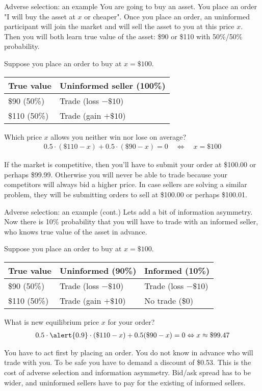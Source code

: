 \documentclass{beamer}
\begin{document}
\begin{frame}{Adverse selection: an example}
\justify
You are going to buy an asset. You place an order
"I will buy the asset at $x$ or cheaper". Once you place an order, an uninformed participant will join the market and will sell the asset to you at this price $x$. Then you will both learn true value of the asset: \$90 or \$110 with 50\%/50\% probability.

\justify
Suppose you place an order to buy at $x=\$100$.

\centering
\begin{tabular}{l|l}
True value & Uninformed seller (100\%)  \\ \hline
\$90 (50\%) & Trade (loss $-\$10$) \\ \hline
\$110 (50\%) & Trade (gain $+\$10$) 
\end{tabular}

\justify
Which price $x$ allows you neither win nor lose on average?
\begin{align*}
0.5\cdot(\$110 - x) + 0.5\cdot(\$90 - x) = 0 \quad \Leftrightarrow \quad x = \$100
\end{align*}

\justify
If the market is competitive, then you'll have to submit your order at \$100.00 or perhaps \$99.99. Otherwise you will never be able to trade because your competitors will always bid a higher price. In case sellers are solving a similar problem, they will be submitting orders to sell at \$100.00 or perhaps \$100.01.
\end{frame}



\begin{frame}{Adverse selection: an example (cont.)}
\justify
Lets add a bit of information asymmetry. Now there is 10\% probability that you will
have to trade with an \alert{informed} seller, who knows true value of the asset in advance.

\justify
Suppose you place an order to buy at $x=\$100$.

\centering
\begin{tabular}{l|l|l}
True value & Uninformed (90\%) & Informed (10\%) \\ \hline
\$90 (50\%) & Trade (loss $-\$10$) & Trade (loss $-\$10$) \\ \hline
\$110 (50\%) & Trade (gain $+\$10$) & No trade (\$0) 
\end{tabular}

\justify
What is new equilibrium price $x$ for your order?
\begin{align*}
0.5\cdot\alert{0.9}\cdot(\$110 - x) + 0.5(\$90 - x) = 0 \Leftrightarrow x \approx \$99.47
\end{align*}

\justify
You have to act first by placing an order. You do not know in advance who will trade with you. To be safe you have to demand a discount of \$0.53. This is the cost of adverse selection and information asymmetry. Bid/ask spread has to be wider, and uninformed sellers have to pay for the existing of informed sellers.
\end{frame}
\end{document}
